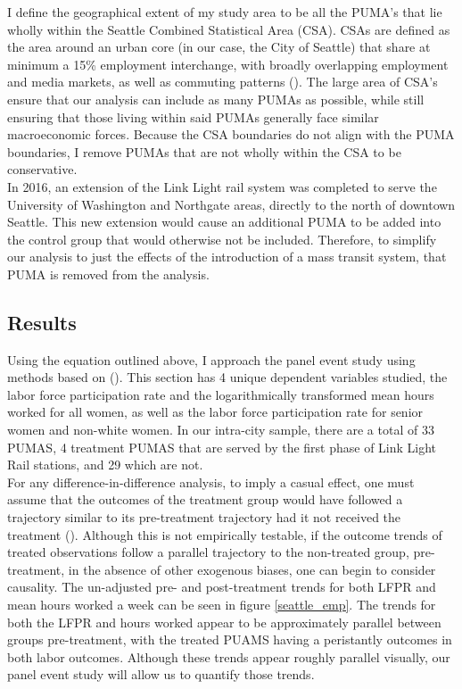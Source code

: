 \documentclass{article}
\begin{document}
I define the geographical extent of my study area to be all the PUMA's that lie wholly within the Seattle Combined Statistical Area (CSA). CSAs are defined as the area around an urban core (in our case, the City of Seattle) that share at minimum a 15\% employment interchange, with broadly overlapping employment and media markets, as well as commuting patterns (\cite{united_states_office_of_management_and_budget_omb_2020}). The large area of CSA's ensure that our analysis can include as many PUMAs as possible, while still ensuring that those living within said PUMAs generally face similar macroeconomic forces. Because the CSA boundaries do not align with the PUMA boundaries, I remove PUMAs that are not wholly within the CSA to be conservative. \\

In 2016, an extension of the Link Light rail system was completed to serve the University of Washington and Northgate areas, directly to the north of downtown Seattle. This new extension would cause an additional PUMA to be added into the control group that would otherwise not be included. Therefore, to simplify our analysis to just the effects of the introduction of a mass transit system, that PUMA is removed from the analysis. \\

\subsection{Results}

Using the equation outlined above, I approach the panel event study using methods based on \citeauthor{clarke_implementing_2020} (\citeyear{clarke_implementing_2020}). This section has 4 unique dependent variables studied, the labor force participation rate and the logarithmically transformed mean hours worked for all women, as well as the labor force participation rate for senior women and non-white women. In our intra-city sample, there are a total of 33 PUMAS, 4 treatment PUMAS that are served by the first phase of Link Light Rail stations, and 29 which are not. \\

For any difference-in-difference analysis, to imply a casual effect, one must assume that the outcomes of the treatment group would have followed a trajectory similar to its pre-treatment trajectory had it not received the treatment (\cite{venkataramani_association_2020}). Although this is not empirically testable, if the outcome trends of treated observations follow a parallel trajectory to the non-treated group, pre-treatment, in the absence of other exogenous biases, one can begin to consider causality. The un-adjusted pre- and post-treatment trends for both LFPR and mean hours worked a week can be seen in figure \ref{seattle_emp}. The trends for both the LFPR and hours worked appear to be approximately parallel between groups pre-treatment, with the treated PUAMS having a peristantly outcomes in both labor outcomes. Although these trends appear roughly parallel visually, our panel event study will allow us to quantify those trends. \\
\end{document}
